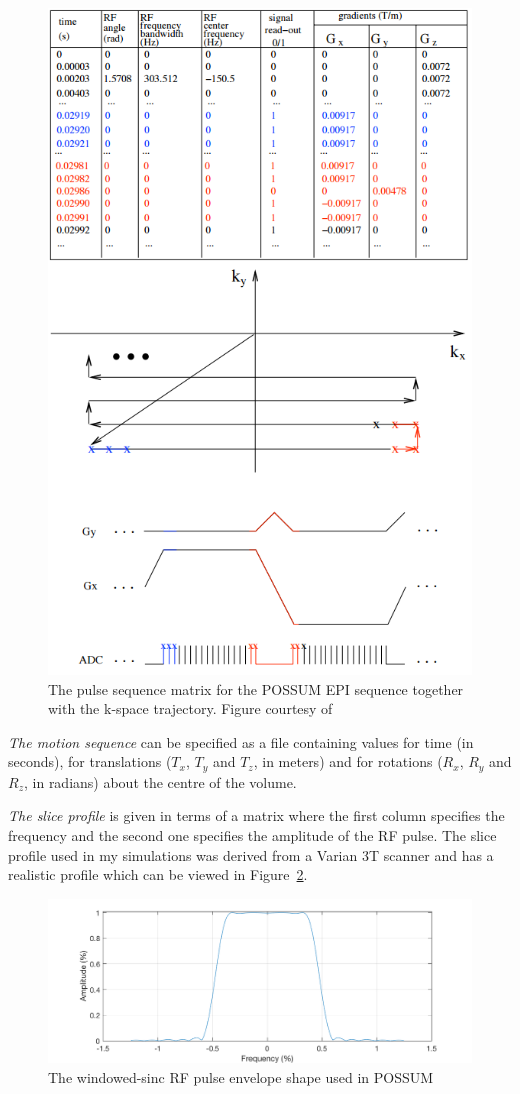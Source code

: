 \begin{figure}[H]
    \centering
    \includegraphics[width=.7\textwidth,keepaspectratio]{pulseseqtable2}
    \caption{The pulse sequence matrix for the POSSUM EPI sequence together with the k-space trajectory. Figure courtesy of \cite{Drobnjak07}}
    \label{fig:pulseseqtable}
\end{figure}

\textit{The motion sequence} can be specified as a file containing values for time (in seconds), for translations ($T_x$, $T_y$ and $T_z$, in meters) and for rotations ($R_x$, $R_y$ and $R_z$, in radians) about the centre of the volume.

\textit{The slice profile} is given in terms of a matrix where the first column specifies the frequency and the second one specifies the amplitude of the RF pulse. The slice profile used in my simulations was derived from a Varian 3T scanner and has a realistic profile which can be viewed in Figure~\ref{fig:sliceprof}. 

\begin{figure}[H]
    \centering
    \includegraphics[width=1\textwidth,keepaspectratio]{slcprof}
    \caption{The windowed-sinc RF pulse envelope shape used in POSSUM}
    \label{fig:sliceprof}
\end{figure}

